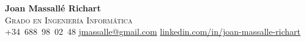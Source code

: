 \documentclass[11pt,a4paper]{article}
\begin{document}
\begin{center}
    
    {\Huge \color{primary} \textbf{Joan Massallé Richart}} \\
    \vspace{3pt}
    {\Large \color{subheadings} \textsc{Grado en Ingeniería Informática}} \\
    \vspace{8pt}
    \color{headings}
    \faPhone \space +34~688~98~02~48 \space \textbullet \space
    \vspace{2pt}
    \faEnvelope \space \href{mailto:jmassalle@gmail.com}{jmassalle@gmail.com} \space \textbullet \space
    \faLinkedin \space \href{https://www.linkedin.com/in/joan-massall%C3%A9-richart-a9064a287/}{linkedin.com/in/joan-massalle-richart} \\
\end{center}

\vspace{15pt}
\end{document}
